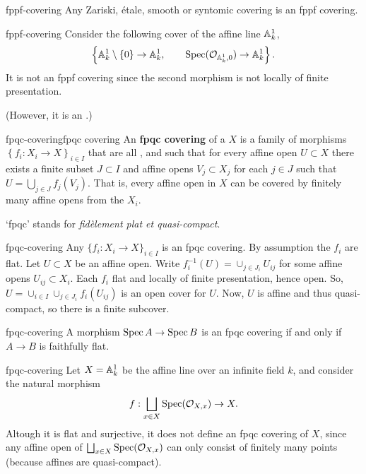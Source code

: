 \begin{example}{fppf-covering}
    Any Zariski, étale, smooth or syntomic covering is an fppf covering.
\end{example}

\begin{example}{fppf-covering}
    Consider the following cover of the affine line $\AA^1_k$,
    \[ \left\{ \AA^1_k \setminus \{ 0 \} \to \AA^1_k, \qquad \Spec(\mathcal{O}_{\AA^1_k, 0}) \to \AA^1_k \right\} . \]
    It is not an fppf covering since the second morphism is not locally of finite presentation.
    
    (However, it is an .)
\end{example}

\begin{topic}{fpqc-covering}{fpqc covering}
    An \textbf{fpqc covering} of a  $X$ is a family of morphisms $\left\{ f_i : X_i \to X \right\}_{i \in I}$ that are all , and such that for every affine open $U \subset X$ there exists a finite subset $J \subset I$ and affine opens $V_j \subset X_j$ for each $j \in J$ such that $U = \bigcup_{j \in J} f_j(V_j)$. That is, every affine open in $X$ can be covered by finitely many affine opens from the $X_i$.
    
    `fpqc' stands for \textit{fidèlement plat et quasi-compact}.
\end{topic}

\begin{example}{fpqc-covering}
    Any  $\{ f_i : X_i \to X \}_{i \in I}$ is an fpqc covering. By assumption the $f_i$ are flat. Let $U \subset X$ be an affine open. Write $f_i^{-1}(U) = \cup_{j \in J_i} U_{ij}$ for some affine opens $U_{ij} \subset X_i$. Each $f_i$ flat and locally of finite presentation, hence open. So, $U = \cup_{i \in I} \cup_{j \in J_i} f_i(U_{ij})$ is an open cover for $U$. Now, $U$ is affine and thus quasi-compact, so there is a finite subcover.
\end{example}

\begin{example}{fpqc-covering}
    A morphism $\Spec A \to \Spec B$ is an fpqc covering if and only if $A \to B$ is faithfully flat.
\end{example}

\begin{example}{fpqc-covering}
    Let $X = \AA^1_k$ be the affine line over an infinite field $k$, and consider the natural morphism
    \[ f : \bigsqcup_{x \in X} \Spec(\mathcal{O}_{X, x}) \to X . \]
    Altough it is flat and surjective, it does not define an fpqc covering of $X$, since any affine open of $\bigsqcup_{x \in X} \Spec(\mathcal{O}_{X, x})$ can only consist of finitely many points (because affines are quasi-compact).
\end{example}

